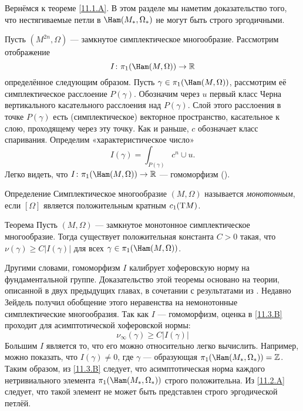Вернёмся к теореме \ref{11.1.A}.
В этом разделе мы наметим доказательство того, что нестягиваемые петли
в $\Ham(M_\ast, \Omega_\ast)$ не могут быть строго эргодичными.

Пусть $(M^{2n},\Omega)$ --- замкнутое симплектическое многообразие.
Рассмотрим отображение
\[I\:\pi_1(\Ham(M,\Omega))\to\RR\]
определённое следующим образом.
Пусть $\gamma\in\pi_1(\Ham(M,\Omega))$,
рассмотрим её симплектическое расслоение $P(\gamma)$.
Обозначим через $u$ первый класс Черна вертикального касательного
расслоения над $P(\gamma)$.
Слой этого расслоения в точке $P(\gamma)$ есть (симплектическое)
векторное пространство, касательное к слою, проходящему через эту
точку. 
Как и раньше, $c$ обозначает класс спаривания.
Определим «характеристическое число» 
\[I(\gamma)= \int_{P(\gamma)} c^n\cup u.\]
Легко видеть, что $I\: \pi_1(\Ham(M, \Omega))\to \RR$ --- гомоморфизм
(\cite{P6,LMP2}). 

\begin{ex}{Определение}\label{11.3.A} Симплектическое многообразие
  $(M,\Omega)$ называется \emph{монотонным}, если $[\Omega]$ является
  положительным кратным $c_1 (\mathrm{T} M)$.
\end{ex}

\begin{thm}[(\cite{P6})]{Теорема}\label{11.3.B}
Пусть $(M, \Omega)$ --- замкнутое монотонное симплектическое многообразие.
Тогда существует положительная константа $C>0$ такая, что
$\nu(\gamma)\ge C|I(\gamma)|$ для всех $\gamma\z\in\pi_1(\Ham(M,\Omega))$.
\end{thm}

Другими словами, гомоморфизм $I$ калибрует хоферовскую норму на
фундаментальной группе.
Доказательство этой теоремы основано на теории, описанной в двух
предыдущих главах, в сочетании с результатами из \cite{Se}.
Недавно Зейдель получил обобщение этого неравенства на немонотонные
симплектические многообразия.
Так как $I$ --- гомоморфизм, оценка в \ref{11.3.B} проходит для
асимптотической хоферовской нормы:
\[\nu_\infty(\gamma)\ge C|I(\gamma)|\]
Большим  $I$ является то,
что его можно относительно легко вычислить.
Например, можно показать, что $I(\gamma) \ne 0$, где $\gamma$ ---
образующая $\pi_1(\Ham(M_\ast,\Omega_\ast)) = \ZZ$.
Таким образом, из \ref{11.3.B} следует, что асимптотическая норма
каждого нетривиального элемента $\pi_1(\Ham(M_\ast, \Omega_\ast))$
строго положительна.
Из \ref{11.2.A} следует, что такой элемент не может быть представлен
строго эргодической петлёй.
